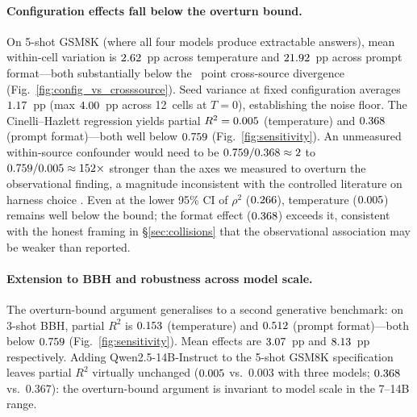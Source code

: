 \documentclass[11pt]{article}
\begin{document}
\paragraph{Configuration effects fall below the overturn bound.}
On 5-shot GSM8K (where all four models produce extractable answers),
mean within-cell variation is $2.62{}$~pp across
temperature and $21.92{}$~pp across prompt format---both
substantially below the \gpqagap{}~point cross-source
divergence (Fig.~\ref{fig:config_vs_crosssource}). Seed variance
at fixed configuration averages $1.17{}$~pp
(max $4.00{}$~pp across 12~cells at $T{=}0$), establishing the
noise floor. The Cinelli--Hazlett regression yields partial
$R^2 = 0.005{}$ (temperature) and $0.368{}$
(prompt format)---both well below $0.759{}$
(Fig.~\ref{fig:sensitivity}). An unmeasured within-source
confounder would need to be $0.759{}/0.368{} \approx 2$
to $0.759{}/0.005{} \approx 152\times$ stronger
than the axes we measured to overturn the observational finding,
a magnitude inconsistent with the controlled literature on harness
choice \citep{alzahrani-2024-benchmarks, biderman-2024-lessons}.
Even at the lower 95\% CI of $\rho^2$ ($0.266{}$), temperature
($0.005{}$) remains well below the bound; the format
effect ($0.368{}$) exceeds it, consistent with the honest
framing in \S\ref{sec:collisions} that the observational
association may be weaker than reported.

\paragraph{Extension to BBH and robustness across model scale.}
The overturn-bound argument generalises to a second generative
benchmark: on 3-shot BBH, partial $R^2$ is $0.153{}$
(temperature) and $0.512{}$ (prompt format)---both below
$0.759{}$ (Fig.~\ref{fig:sensitivity}). Mean effects are
$3.07{}$~pp and $8.13{}$~pp respectively.
Adding Qwen2.5-14B-Instruct to the 5-shot GSM8K specification
leaves partial $R^2$ virtually unchanged ($0.005{}$ vs.\
0.003 with three models; $0.368{}$ vs.\ 0.367): the
overturn-bound argument is invariant to model scale in the
7--14B range.
\end{document}
